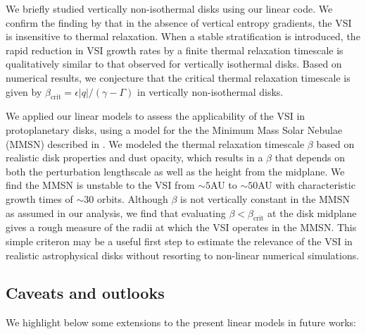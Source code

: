 
We briefly studied vertically non-isothermal disks using our linear 
code. We confirm the finding by \cite{nelson13} that in the absence
of vertical entropy gradients, the VSI is insensitive to
thermal relaxation. When a stable stratification is introduced, the
rapid reduction in VSI growth rates by a finite thermal relaxation
timescale is qualitatively similar to that observed for vertically
isothermal disks. Based on numerical results, we conjecture that the
critical thermal relaxation timescale is given by 
$\beta_\mathrm{crit}=\epsilon|q|/(\gamma-\Gamma)$ in vertically 
non-isothermal disks.  


We applied our linear models to assess the applicability of the VSI in
protoplanetary disks, using a model for the the Minimum Mass Solar Nebulae
(MMSN) described in \cite{chiang10}. We  
modeled the thermal relaxation timescale $\beta$ based on realistic
disk properties and dust opacity, which results in a $\beta$ that
depends on both the perturbation lengthscale as well as the height
from the midplane. We find the MMSN is unstable to the VSI
from $\sim 5$AU to $\sim50$AU with characteristic growth times of
$\sim 30$ orbits. Although $\beta$ is not vertically constant in the
MMSN as assumed in our analysis, we find that evaluating $\beta <
\beta_\mathrm{crit}$ at the disk midplane gives a rough measure of the
radii at which the VSI operates in the MMSN.  This simple criteron may
be a useful first step to estimate the relevance of the VSI in
realistic astrophysical disks without resorting to non-linear
numerical simulations.  



\subsection{Caveats and outlooks} 
We highlight below some extensions to the present  
linear models in future works:  

